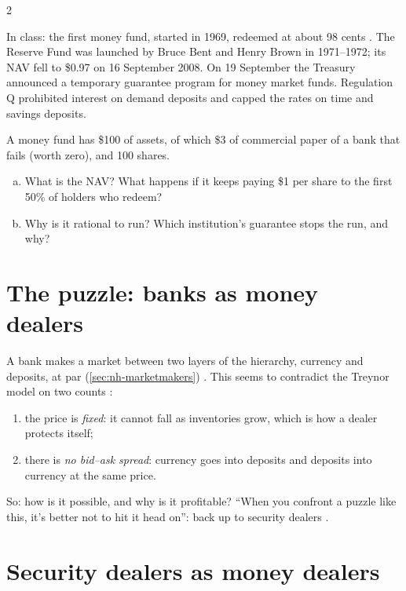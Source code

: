 \begin{paracol}{2}
\begin{coursenote}
In class: the first money fund, started in 1969, redeemed at about 98 cents . The Reserve Fund was launched by Bruce Bent and Henry Brown in
1971--1972; its NAV fell to \$0.97 on 16 September 2008. On 19 September the Treasury announced a temporary guarantee program for money market funds. Regulation Q
prohibited interest on demand deposits and capped the rates on time and savings deposits.
\end{coursenote}

\begin{exercise}
A money fund has \$100 of assets, of which \$3 of commercial paper of a bank that fails (worth zero), and 100 shares.
\begin{enumerate}[(a)]
  \item What is the NAV? What happens if it keeps paying \$1 per share to the first 50\% of holders who redeem?
  \item Why is it rational to run? Which institution's guarantee stops the run, and why?
\end{enumerate}
\end{exercise}

\section{The puzzle: banks as money dealers}\label{sec:bl-puzzle}

A bank makes a market between two layers of the hierarchy, currency and deposits, at par (\cref{sec:nh-marketmakers}) . This seems to contradict the Treynor
model on two counts :
\begin{enumerate}
  \item the price is \emph{fixed}: it cannot fall as inventories grow, which is how a dealer protects itself;
  \item there is \emph{no bid--ask spread}: currency goes into deposits and deposits into currency at the same price.
\end{enumerate}
So: how is it possible, and why is it profitable? ``When you confront a puzzle like this, it's better not to hit it head on'': back up to security dealers
.

\section{Security dealers as money dealers}\label{sec:bl-moneydealers}


\end{paracol}
